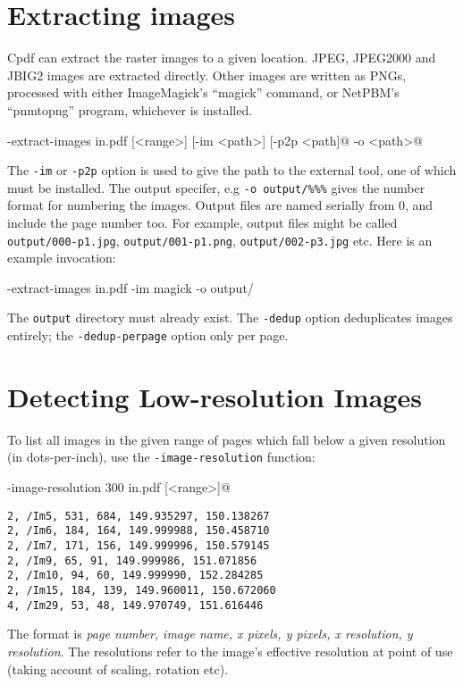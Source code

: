 \documentclass{book}
\begin{document}
\section{Extracting images}

Cpdf can extract the raster images to a given location. JPEG, JPEG2000 and JBIG2 images are extracted directly. Other images are written as PNGs, processed with either ImageMagick's ``magick'' command, or NetPBM's ``pnmtopng'' program, whichever is installed.

  \begin{framed}
  \noindent\small\verb@cpdf -extract-images in.pdf [<range>] [-im <path>] [-p2p <path]@
  \noindent\small{} -o <path>@
  \end{framed}

\noindent The \texttt{-im} or \texttt{-p2p} option is used to give the path to the external tool, one of which must be installed. The output specifer, e.g \verb!-o output/%%%! gives the number format for numbering the images. Output files are named serially from 0, and include the page number too. For example, output files might be called \texttt{output/000-p1.jpg}, \texttt{output/001-p1.png}, \texttt{output/002-p3.jpg} etc. Here is an example invocation:

  \begin{framed}
  \noindent\small\verb@cpdf -extract-images in.pdf -im magick -o output/%%%@
  \end{framed}

\noindent The \texttt{output} directory must already exist. The \texttt{-dedup} option deduplicates images entirely; the \texttt{-dedup-perpage} option only per page.

  \section{Detecting Low-resolution Images}\label{imageres}
  To list all images in the given range of pages which fall below a given resolution (in dots-per-inch), use the \verb!-image-resolution! function:
  \begin{framed}
  \noindent\small\verb@cpdf -image-resolution 300 in.pdf [<range>]@
  \end{framed}

  \begin{framed}
{\small\begin{verbatim}2, /Im5, 531, 684, 149.935297, 150.138267
2, /Im6, 184, 164, 149.999988, 150.458710
2, /Im7, 171, 156, 149.999996, 150.579145
2, /Im9, 65, 91, 149.999986, 151.071856
2, /Im10, 94, 60, 149.999990, 152.284285
2, /Im15, 184, 139, 149.960011, 150.672060
4, /Im29, 53, 48, 149.970749, 151.616446\end{verbatim}}
  \end{framed}
  \noindent The format is \textit{page number, image name, x pixels, y pixels, x resolution, y resolution}. The resolutions refer to the image's effective resolution at point of use (taking account of scaling, rotation etc).
\end{document}
